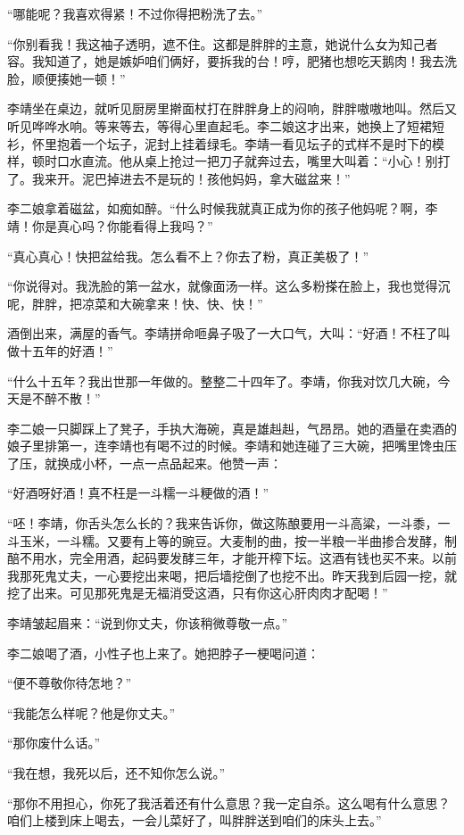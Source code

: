 “哪能呢？我喜欢得紧！不过你得把粉洗了去。”

“你别看我！我这袖子透明，遮不住。这都是胖胖的主意，她说什么女为知己者容。我知道了，她是嫉妒咱们俩好，要拆我的台！哼，肥猪也想吃天鹅肉！我去洗脸，顺便揍她一顿！”

李靖坐在桌边，就听见厨房里擀面杖打在胖胖身上的闷响，胖胖嗷嗷地叫。然后又听见哗哗水响。等来等去，等得心里直起毛。李二娘这才出来，她换上了短裙短衫，怀里抱着一个坛子，泥封上挂着绿毛。李靖一看见坛子的式样不是时下的模样，顿时口水直流。他从桌上抢过一把刀子就奔过去，嘴里大叫着：“小心！别打了。我来开。泥巴掉进去不是玩的！孩他妈妈，拿大磁盆来！”

李二娘拿着磁盆，如痴如醉。“什么时候我就真正成为你的孩子他妈呢？啊，李靖！你是真心吗？你能看得上我吗？”

“真心真心！快把盆给我。怎么看不上？你去了粉，真正美极了！”

“你说得对。我洗脸的第一盆水，就像面汤一样。这么多粉搽在脸上，我也觉得沉呢，胖胖，把凉菜和大碗拿来！快、快、快！”

酒倒出来，满屋的香气。李靖拼命咂鼻子吸了一大口气，大叫：“好酒！不枉了叫做十五年的好酒！”

“什么十五年？我出世那一年做的。整整二十四年了。李靖，你我对饮几大碗，今天是不醉不散！”

李二娘一只脚踩上了凳子，手执大海碗，真是雄赳赳，气昂昂。她的酒量在卖酒的娘子里排第一，连李靖也有喝不过的时候。李靖和她连碰了三大碗，把嘴里馋虫压了压，就换成小杯，一点一点品起来。他赞一声：

“好酒呀好酒！真不枉是一斗糯一斗粳做的酒！”

“呸！李靖，你舌头怎么长的？我来告诉你，做这陈酿要用一斗高粱，一斗黍，一斗玉米，一斗糯。又要有上等的豌豆。大麦制的曲，按一半粮一半曲掺合发酵，制醅不用水，完全用酒，起码要发酵三年，才能开榨下坛。这酒有钱也买不来。以前我那死鬼丈夫，一心要挖出来喝，把后墙挖倒了也挖不出。昨天我到后园一挖，就挖了出来。可见那死鬼是无福消受这酒，只有你这心肝肉肉才配喝！”

李靖皱起眉来：“说到你丈夫，你该稍微尊敬一点。”

李二娘喝了酒，小性子也上来了。她把脖子一梗喝问道：

“便不尊敬你待怎地？”

“我能怎么样呢？他是你丈夫。”

“那你废什么话。”

“我在想，我死以后，还不知你怎么说。”

“那你不用担心，你死了我活着还有什么意思？我一定自杀。这么喝有什么意思？咱们上楼到床上喝去，一会儿菜好了，叫胖胖送到咱们的床头上去。”

